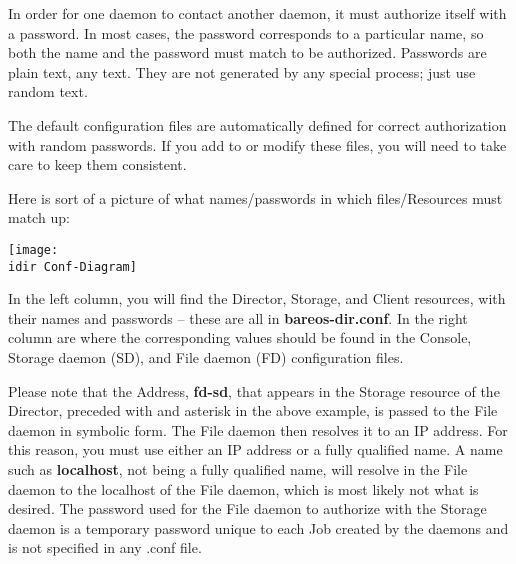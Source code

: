 In order for one daemon to contact another daemon, it must authorize itself
with a password. In most cases, the password corresponds to a particular name,
so both the name and the password must match to be authorized. Passwords are
plain text, any text.  They are not generated by any special process; just
use random text.

The default configuration files are automatically defined for correct
authorization with random passwords. If you add to or modify these files, you
will need to take care to keep them consistent.

Here is sort of a picture of what names/passwords in which files/Resources
must match up:

\texttt{[image: \\idir Conf-Diagram]}

In the left column, you will find the Director, Storage, and Client resources,
with their names and passwords -- these are all in {\bf bareos-dir.conf}. In
the right column are where the corresponding values should be found in the
Console, Storage daemon (SD), and File daemon (FD) configuration files.

Please note that the Address, {\bf fd-sd}, that appears in the Storage
resource of the Director, preceded with and asterisk in the above example, is
passed to the File daemon in symbolic form. The File daemon then resolves it
to an IP address. For this reason, you must use either an IP address or a
fully qualified name. A name such as {\bf localhost}, not being a fully
qualified name, will resolve in the File daemon to the localhost of the File
daemon, which is most likely not what is desired. The password used for the
File daemon to authorize with the Storage daemon is a temporary password
unique to each Job created by the daemons and is not specified in any .conf
file.
